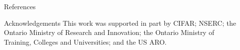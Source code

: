 \documentclass{beamer}
\newlength{\sepwid}
\newlength{\onecolwid}
\begin{document}
\begin{frame}[t]
\begin{columns}[t]
\begin{column}{\onecolwid}
  
  
  \begin{block}{References}
  \nocite{*}
  
  \footnotesize{}
  \end{block}
  
  \begin{block}{Acknowledgements}
    \footnotesize{This work was supported in part by CIFAR; NSERC; the Ontario Ministry of Research and Innovation; the Ontario Ministry of Training, Colleges and Universities; and the US ARO.}
  \end{block}


\end{column}

\begin{column}{\sepwid}\end{column}

\end{columns}
\end{frame}
\end{document}
